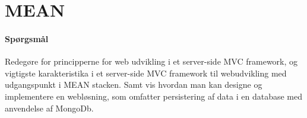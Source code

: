 \section{MEAN}

\paragraph{Spørgsmål}
Redegøre for principperne for web udvikling i et server-side MVC framework, og vigtigste karakteristika i et server-side MVC framework til webudvikling med udgangspunkt i MEAN stacken. Samt vis hvordan man kan designe og implementere en webløsning, som omfatter persistering af data i en database med anvendelse af MongoDb.
